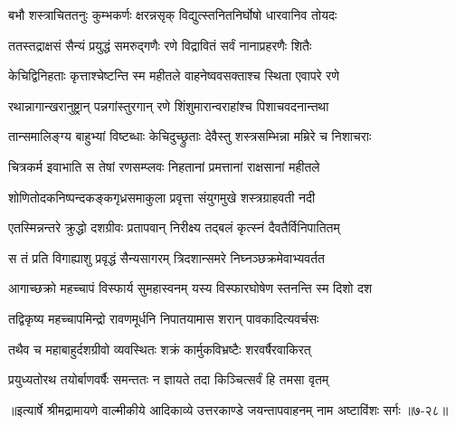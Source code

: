 \twolineshloka
{बभौ शस्त्राचिततनुः कुम्भकर्णः क्षरन्नसृक्}
{विद्युत्स्तनितनिर्घोषो धारवानिव तोयदः} %

\twolineshloka
{ततस्तद्राक्षसं सैन्यं प्रयुद्धं समरुद्गणैः}
{रणे विद्रावितं सर्वं नानाप्रहरणैः शितैः} %

\twolineshloka
{केचिद्विनिहताः कृत्ताश्चेष्टन्ति स्म महीतले}
{वाहनेष्ववसक्ताश्च स्थिता एवापरे रणे} %

\twolineshloka
{रथान्नागान्खरानुष्ट्रान् पन्नगांस्तुरगान् रणे}
{शिंशुमारान्वराहांश्च पिशाचवदनान्तथा} %

\twolineshloka
{तान्समालिङ्ग्य बाहुभ्यां विष्टब्धाः केचिदुच्छ्रुताः}
{देवैस्तु शस्त्रसम्भिन्ना मम्रिरे च निशाचराः} %

\twolineshloka
{चित्रकर्म इवाभाति स तेषां रणसम्प्लवः}
{निहतानां प्रमत्तानां राक्षसानां महीतले} %

\twolineshloka
{शोणितोदकनिष्पन्दकङ्कगृध्रसमाकुला}
{प्रवृत्ता संयुगमुखे शस्त्रग्राहवती नदी} %

\twolineshloka
{एतस्मिन्नन्तरे क्रुद्धो दशग्रीवः प्रतापवान्}
{निरीक्ष्य तद्बलं कृत्स्नं दैवतैर्विनिपातितम्} %

\twolineshloka
{स तं प्रति विगाह्याशु प्रवृद्धं सैन्यसागरम्}
{त्रिदशान्समरे निघ्नञ्छक्रमेवाभ्यवर्तत} %

\twolineshloka
{आगाच्छक्रो महच्चापं विस्फार्य सुमहास्वनम्}
{यस्य विस्फारघोषेण स्तनन्ति स्म दिशो दश} %

\twolineshloka
{तद्विकृष्य महच्चापमिन्द्रो रावणमूर्धनि}
{निपातयामास शरान् पावकादित्यवर्चसः} %

\twolineshloka
{तथैव च महाबाहुर्दशग्रीवो व्यवस्थितः}
{शक्रं कार्मुकविभ्रष्टैः शरवर्षैरवाकिरत्} %

\twolineshloka
{प्रयुध्यतोरथ तयोर्बाणवर्षैः समन्ततः}
{न ज्ञायते तदा किञ्चित्सर्वं हि तमसा वृतम्} %


॥इत्यार्षे श्रीमद्रामायणे वाल्मीकीये आदिकाव्ये उत्तरकाण्डे जयन्तापवाहनम् नाम अष्टाविंशः सर्गः ॥७-२८॥
